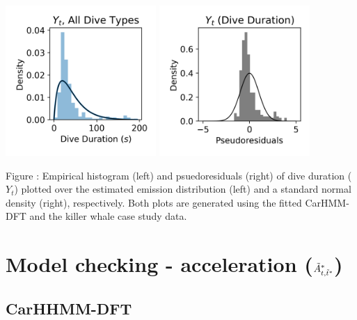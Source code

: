 \documentclass{article}
\begin{document}
        \begin{center}
        \includegraphics[width=2.25in]{../Plots/2019/20190902-182840-CATs_OB_1_0_267_CarHMM_empirical_hist_dive_duration.png}
        \includegraphics[width=2.25in]{../Plots/2019/20190902-182840-CATs_OB_1_0_267_CarHMM_pseudresids_Dive_Duration.png}
        \end{center}
        
        \noindent Figure : Empirical histogram (left) and psuedoresiduals (right) of dive duration ($Y_{t}$) plotted over the estimated emission distribution (left) and a standard normal density (right), respectively. Both plots are generated using the fitted CarHMM-DFT and the killer whale case study data.
        \addtocounter{fignum}{1}
        
    \newpage
    \section{Model checking - acceleration ($\tilde{A}^*_{t,\tilde t^*}$)}
        
        \subsection{CarHHMM-DFT}
        
\end{document}
